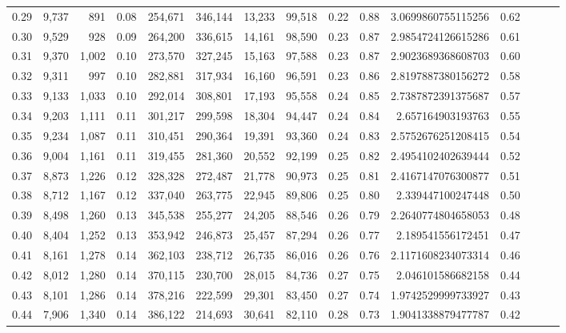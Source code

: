 \begin{tabular}{rrrrrrrrrrrrrrr}
0.29 &   9,737 &    891 &  0.08 &  254,671 &  346,144 &   13,233 &   99,518 &  0.22 &  0.88 &    3.0699860755115256 &      0.62 \\
0.30 &   9,529 &    928 &  0.09 &  264,200 &  336,615 &   14,161 &   98,590 &  0.23 &  0.87 &    2.9854724126615286 &      0.61 \\
0.31 &   9,370 &  1,002 &  0.10 &  273,570 &  327,245 &   15,163 &   97,588 &  0.23 &  0.87 &    2.9023689368608703 &      0.60 \\
0.32 &   9,311 &    997 &  0.10 &  282,881 &  317,934 &   16,160 &   96,591 &  0.23 &  0.86 &    2.8197887380156272 &      0.58 \\
0.33 &   9,133 &  1,033 &  0.10 &  292,014 &  308,801 &   17,193 &   95,558 &  0.24 &  0.85 &    2.7387872391375687 &      0.57 \\
0.34 &   9,203 &  1,111 &  0.11 &  301,217 &  299,598 &   18,304 &   94,447 &  0.24 &  0.84 &     2.657164903193763 &      0.55 \\
0.35 &   9,234 &  1,087 &  0.11 &  310,451 &  290,364 &   19,391 &   93,360 &  0.24 &  0.83 &    2.5752676251208415 &      0.54 \\
0.36 &   9,004 &  1,161 &  0.11 &  319,455 &  281,360 &   20,552 &   92,199 &  0.25 &  0.82 &    2.4954102402639444 &      0.52 \\
0.37 &   8,873 &  1,226 &  0.12 &  328,328 &  272,487 &   21,778 &   90,973 &  0.25 &  0.81 &    2.4167147076300877 &      0.51 \\
0.38 &   8,712 &  1,167 &  0.12 &  337,040 &  263,775 &   22,945 &   89,806 &  0.25 &  0.80 &     2.339447100247448 &      0.50 \\
0.39 &   8,498 &  1,260 &  0.13 &  345,538 &  255,277 &   24,205 &   88,546 &  0.26 &  0.79 &    2.2640774804658053 &      0.48 \\
0.40 &   8,404 &  1,252 &  0.13 &  353,942 &  246,873 &   25,457 &   87,294 &  0.26 &  0.77 &     2.189541556172451 &      0.47 \\
0.41 &   8,161 &  1,278 &  0.14 &  362,103 &  238,712 &   26,735 &   86,016 &  0.26 &  0.76 &    2.1171608234073314 &      0.46 \\
0.42 &   8,012 &  1,280 &  0.14 &  370,115 &  230,700 &   28,015 &   84,736 &  0.27 &  0.75 &     2.046101586682158 &      0.44 \\
0.43 &   8,101 &  1,286 &  0.14 &  378,216 &  222,599 &   29,301 &   83,450 &  0.27 &  0.74 &    1.9742529999733927 &      0.43 \\
0.44 &   7,906 &  1,340 &  0.14 &  386,122 &  214,693 &   30,641 &   82,110 &  0.28 &  0.73 &    1.9041338879477787 &      0.42 \\

\end{tabular}
